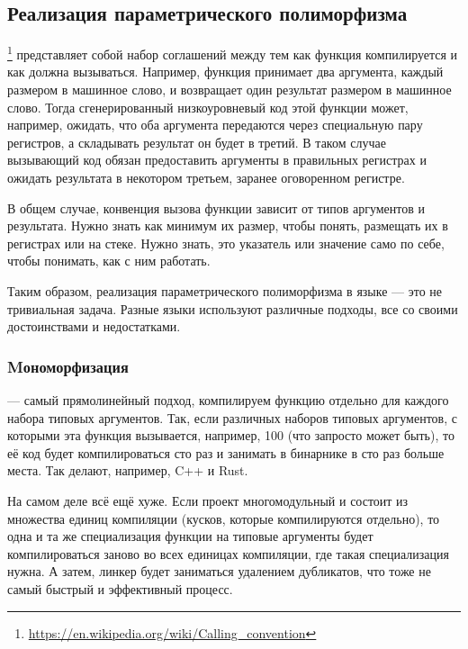 \subsection{Реализация параметрического полиморфизма}

\footnote{\url{https://en.wikipedia.org/wiki/Calling_convention}} представляет собой набор соглашений между тем как функция компилируется и как должна вызываться.
Например, функция принимает два аргумента, каждый размером в машинное слово, и возвращает один результат размером в машинное слово.
Тогда сгенерированный низкоуровневый код этой функции может, например, ожидать, что оба аргумента передаются через специальную пару регистров, а складывать результат он будет в третий.
В таком случае вызывающий код обязан предоставить аргументы в правильных регистрах и ожидать результата в некотором третьем, заранее оговоренном регистре.

В общем случае, конвенция вызова функции зависит от типов аргументов и результата.
Нужно знать как минимум их размер, чтобы понять, размещать их в регистрах или на стеке.
Нужно знать, это указатель или значение само по себе, чтобы понимать, как с ним работать.

Таким образом, реализация параметрического полиморфизма в языке --- это не тривиальная задача.
Разные языки используют различные подходы, все со своими достоинствами и недостатками.

\subsubsection{Mономорфизация} \label{subsubsec:monomorphization}

 --- самый прямолинейный подход, компилируем функцию отдельно для каждого набора типовых аргументов.
Так, если различных наборов типовых аргументов, с которыми эта функция вызывается, например, 100 (что запросто может быть), то её код будет компилироваться сто раз и занимать в бинарнике в сто раз больше места.
Так делают, например, C++ и Rust.

На самом деле всё ещё хуже.
Если проект многомодульный и состоит из множества единиц компиляции (кусков, которые компилируются отдельно), то одна и та же специализация функции на типовые аргументы будет компилироваться заново во всех единицах компиляции, где такая специализация нужна.
А затем, линкер будет заниматься удалением дубликатов, что тоже не самый быстрый и эффективный процесс.

